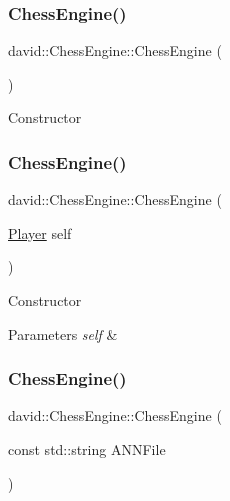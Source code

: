 \subsubsection{\texorpdfstring{Chess\+Engine()}{ChessEngine()}\hspace{0.1cm}{\footnotesize\ttfamily [1/4]}}
{\footnotesize\ttfamily david\+::\+Chess\+Engine\+::\+Chess\+Engine (\begin{DoxyParamCaption}{ }\end{DoxyParamCaption})}

Constructor \mbox{\label{classdavid_1_1ChessEngine_a93e1910ba6f2ea91a64027ae404ea47c}} 
\subsubsection{\texorpdfstring{Chess\+Engine()}{ChessEngine()}\hspace{0.1cm}{\footnotesize\ttfamily [2/4]}}
{\footnotesize\ttfamily david\+::\+Chess\+Engine\+::\+Chess\+Engine (\begin{DoxyParamCaption}\item[{\hyperlink{structdavid_1_1Player}{Player}}]{self }\end{DoxyParamCaption})}

Constructor


\begin{DoxyParams}{Parameters}
{\em self} & \\
\hline
\end{DoxyParams}
\mbox{\label{classdavid_1_1ChessEngine_a850f69799f447605f730eb6edff09a1e}} 
\subsubsection{\texorpdfstring{Chess\+Engine()}{ChessEngine()}\hspace{0.1cm}{\footnotesize\ttfamily [3/4]}}
{\footnotesize\ttfamily david\+::\+Chess\+Engine\+::\+Chess\+Engine (\begin{DoxyParamCaption}\item[{const std\+::string}]{A\+N\+N\+File }\end{DoxyParamCaption})}

